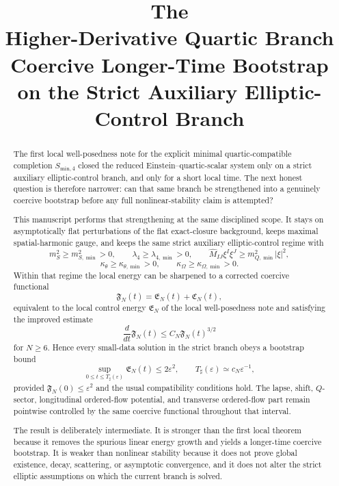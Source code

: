 \documentclass[11pt]{article}
\title{\textbf{The \TheoryName{}}\\[0.4em]
\large Higher-Derivative Quartic Branch Coercive Longer-Time Bootstrap on the Strict Auxiliary Elliptic-Control Branch}
\author{}
\date{}
\begin{document}
\maketitle

\begin{abstract}
The first local well-posedness note for the explicit minimal quartic-compatible completion \(S_{\mathrm{min},4}\) closed the reduced Einstein--quartic-scalar system only on a strict auxiliary elliptic-control branch, and only for a short local time. The next honest question is therefore narrower: can that same branch be strengthened into a genuinely coercive bootstrap before any full nonlinear-stability claim is attempted?

This manuscript performs that strengthening at the same disciplined scope. It stays on asymptotically flat perturbations of the flat exact-closure background, keeps maximal spatial-harmonic gauge, and keeps the same strict auxiliary elliptic-control regime with
\[
m_S^2\ge m_{S,\min}^2>0,\qquad
\lambda_4\ge \lambda_{4,\min}>0,\qquad
\widehat M_{IJ}\xi^I\xi^J\ge m_{Q,\min}^2|\xi|^2,
\]
\[
\kappa_\theta\ge \kappa_{\theta,\min}>0,
\qquad
\kappa_\Omega\ge \kappa_{\Omega,\min}>0.
\]
Within that regime the local energy can be sharpened to a corrected coercive functional
\[
\mathfrak F_N(t)=\mathfrak E_N(t)+\mathfrak C_N(t),
\]
equivalent to the local control energy \(\mathfrak E_N\) of the local well-posedness note and satisfying the improved estimate
\[
\frac{d}{dt}\mathfrak F_N(t)\le C_N\mathfrak F_N(t)^{3/2}
\]
for \(N\ge 6\). Hence every small-data solution in the strict branch obeys a bootstrap bound
\[
\sup_{0\le t\le T_\sharp(\varepsilon)}\mathfrak E_N(t)\le 2\varepsilon^2,
\qquad
T_\sharp(\varepsilon)\simeq c_N\varepsilon^{-1},
\]
provided \(\mathfrak F_N(0)\le \varepsilon^2\) and the usual compatibility conditions hold. The lapse, shift, \(Q\)-sector, longitudinal ordered-flow potential, and transverse ordered-flow part remain pointwise controlled by the same coercive functional throughout that interval.

The result is deliberately intermediate. It is stronger than the first local theorem because it removes the spurious linear energy growth and yields a longer-time coercive bootstrap. It is weaker than nonlinear stability because it does not prove global existence, decay, scattering, or asymptotic convergence, and it does not alter the strict elliptic assumptions on which the current branch is solved.
\end{abstract}
\end{document}
